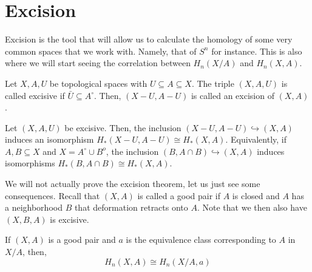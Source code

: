 \documentclass[12pt,reqno]{amsart}
\numberwithin{theorem}{section}
\theoremstyle{definition}
\theoremstyle{remark}
\numberwithin{equation}{section}
\theoremstyle{definition}
\begin{document}
\section{Excision}
Excision is the tool that will allow us to calculate the homology of some very common spaces that we work with. Namely, that of $S^n$ for instance. This is also where we will start seeing the correlation between $H_n(X/A)$ and $H_n(X,A)$. 
\begin{definition}
    Let $X,A, U$ be topological spaces with $U\subseteq A \subseteq X$. The triple $(X,A,U)$ is called excisive if $\bar U \subseteq A^\circ$. Then, $(X-U,A-U)$ is called an excision of $(X,A)$.
\end{definition}
\begin{theorem}
    Let $(X,A,U)$ be excisive. Then, the inclusion $(X-U,A-U) \hookrightarrow (X,A)$ induces an isomorphism $H_*(X-U,A-U)\cong H_*(X,A)$. Equivalently, if $A,B\subseteq X$ and $X = A^\circ \cup B^o$, the inclusion $(B,A\cap B) \hookrightarrow (X,A)$ induces isomorphisms $H_*(B,A\cap B) \cong H_*(X,A)$.
\end{theorem}
We will not actually prove the excision theorem, let us just see some consequences. Recall that $(X,A)$ is called a good pair if $A$ is closed and $A$ has a neighborhood $B$ that deformation retracts onto $A$. Note that we then also have $(X,B,A)$ is excisive.
\begin{theorem}
    If $(X,A)$ is a good pair and $a$ is the equivalence class corresponding to $A$ in $X/A$, then,
    $$H_n(X,A) \cong H_n(X/A,a)$$
\end{theorem}
\end{document}

